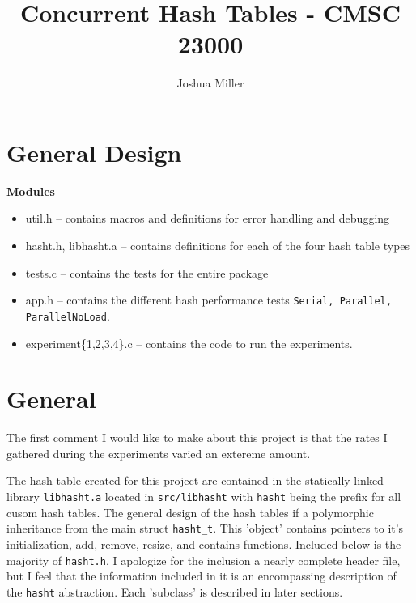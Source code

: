 

\title{Concurrent Hash Tables - CMSC 23000 } 
\author{Joshua Miller}


\maketitle


\renewcommand{\t}[1]{{\tt\sc #1}}

\section{General Design}

{\bf Modules}
\begin{itemize}
\item util.h -- contains macros and definitions for error handling and debugging
\item hasht.h, libhasht.a -- contains definitions for each of the four hash table types 
\item tests.c -- contains the tests for the entire package
\item app.h -- contains the different hash performance tests
  \t{Serial, Parallel, ParallelNoLoad}.
\item experiment\{1,2,3,4\}.c -- contains the code to run the experiments.
\end{itemize}

\section{General}

The first comment I would like to make about this project is that the
rates I gathered during the experiments varied an extereme amount.  


The hash table created for this project are contained in the
statically linked library {\tt libhasht.a} located in {\tt src/libhasht} with
{\tt hasht} being the prefix for all cusom hash tables.  The general
design of the hash tables if a polymorphic inheritance from the main
struct \t{hasht\_t}.  This 'object' contains pointers to it's
initialization, add, remove, resize, and contains functions.  Included
below is the majority of \t{hasht.h}.  I apologize for the inclusion a
nearly complete header file, but I feel that the information included
in it is an encompassing description of the \t{hasht}
abstraction. Each 'subclass' is described in later sections.


